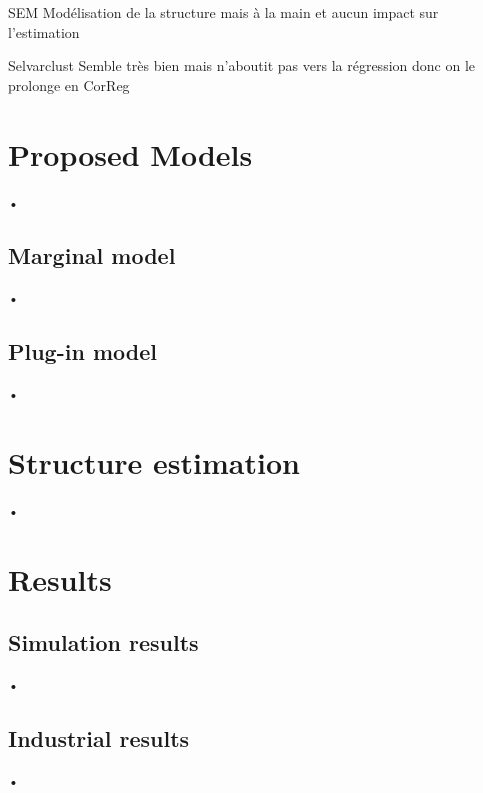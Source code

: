 \documentclass[11pt]{beamer}
\begin{document}
		\begin{frame}{ SEM }
		 Modélisation de la structure mais à la main et aucun impact sur l'estimation
		 \end{frame}
		 
		\begin{frame}{ Selvarclust }
			Semble très bien mais n'aboutit pas vers la régression donc on le prolonge en CorReg
		\end{frame}
\section{Proposed Models}
	\begin{frame}{•}
	
	\end{frame}
	\subsection{Marginal model}
		\begin{frame}{•}
		
		\end{frame}
	\subsection{Plug-in model}
		\begin{frame}{•}
		
		\end{frame}
\section{Structure estimation}
	\begin{frame}{•}
	
	\end{frame}

\section{Results}
	\subsection{Simulation results}
		\begin{frame}{•}
		
		\end{frame}
	\subsection{Industrial results}
		\begin{frame}{•}
		
		\end{frame}
\end{document}
